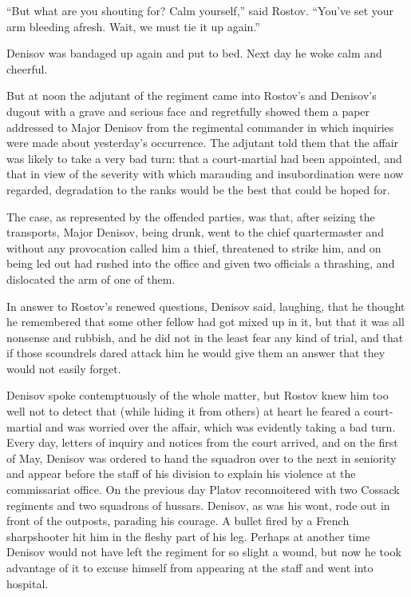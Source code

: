 ``But what are you shouting for? Calm yourself,'' said
Rostov. ``You've set your arm bleeding afresh. Wait, we must tie
it up again.''

Denisov was bandaged up again and put to bed. Next day he woke
calm and cheerful.

But at noon the adjutant of the regiment came into Rostov's and
Denisov's dugout with a grave and serious face and regretfully
showed them a paper addressed to Major Denisov from the
regimental commander in which inquiries were made about
yesterday's occurrence. The adjutant told them that the affair
was likely to take a very bad turn: that a court-martial had been
appointed, and that in view of the severity with which marauding
and insubordination were now regarded, degradation to the ranks
would be the best that could be hoped for.

The case, as represented by the offended parties, was that, after
seizing the transports, Major Denisov, being drunk, went to the
chief quartermaster and without any provocation called him a
thief, threatened to strike him, and on being led out had rushed
into the office and given two officials a thrashing, and
dislocated the arm of one of them.

In answer to Rostov's renewed questions, Denisov said, laughing,
that he thought he remembered that some other fellow had got
mixed up in it, but that it was all nonsense and rubbish, and he
did not in the least fear any kind of trial, and that if those
scoundrels dared attack him he would give them an answer that
they would not easily forget.

Denisov spoke contemptuously of the whole matter, but Rostov knew
him too well not to detect that (while hiding it from others) at
heart he feared a court-martial and was worried over the affair,
which was evidently taking a bad turn. Every day, letters of
inquiry and notices from the court arrived, and on the first of
May, Denisov was ordered to hand the squadron over to the next in
seniority and appear before the staff of his division to explain
his violence at the commissariat office. On the previous day
Platov reconnoitered with two Cossack regiments and two squadrons
of hussars. Denisov, as was his wont, rode out in front of the
outposts, parading his courage. A bullet fired by a French
sharpshooter hit him in the fleshy part of his leg. Perhaps at
another time Denisov would not have left the regiment for so
slight a wound, but now he took advantage of it to excuse himself
from appearing at the staff and went into hospital.

